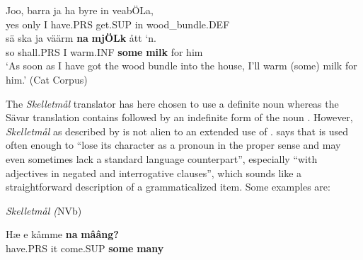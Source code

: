 

 \ea\label{}
\gll Joo,  barra  ja  ha  byre  in  veabÖLa,  \\


yes  only  I  have.PRS  get.SUP  in  wood\_bundle.DEF  \\

 \ea\label{}
\gll sä  ska  ja  väärm  \textbf{na} \textbf{mjÖLk} ått  ‘n.\\


so  shall.PRS  I  warm.INF  \textbf{some} \textbf{milk} for   him\\

\glt ‘As soon as I have got the wood bundle into the house, I’ll warm (some) milk for him.’ (Cat Corpus)

\z

The \textit{Skelletmål} translator has here chosen to use a definite noun whereas the Sävar translation contains followed by an indefinite form of the noun . However, \textit{Skelletmål} as described by \citet{Marklund1976} is not alien to an extended use of . \citet[43]{Marklund1976} says that  is used often enough to “lose its character as a pronoun in the proper sense and may even sometimes lack a standard language counterpart”, especially “with adjectives in negated and interrogative clauses”, which sounds like a straightforward description of a grammaticalized item. Some examples are:


\item 

\textit{Skelletmål (}NVb)



 \ea\label{}
\gll Hæ  e  kåmme  \textbf{na}\textbf{  mââng?}\\


have.PRS  it  come.SUP  \textbf{some} \textbf{many}\\

